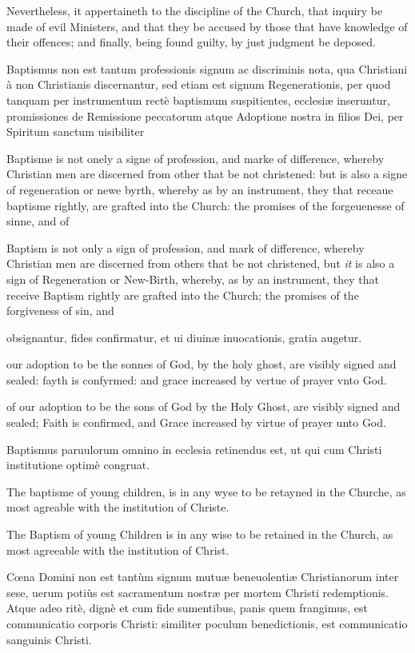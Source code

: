 Nevertheless, it appertaineth to the discipline of the Church, that inquiry be made of evil Ministers, and that they be accused by those that have knowledge of their offences; and finally, being found guilty, by just judgment be deposed.


Baptismus non est tantum professionis signum ac discriminis nota, qua Christiani à non Christianis discernantur, sed etiam est signum Regenerationis, per quod tanquam per instrumentum rectè baptismum suspitientes, ecclesiæ inseruntur, promissiones de Remissione peccatorum atque Adoptione nostra in filios Dei, per Spiritum sanctum uisibiliter

Baptisme is not onely a signe of profession, and marke of difference, whereby Christian men are discerned from other that be not christened: but is also a signe of regeneration or newe byrth, whereby as by an instrument, they that receaue baptisme rightly, are grafted into the Church: the promises of the forgeuenesse of sinne, and of

Baptism is not only a sign of profession, and mark of difference, whereby Christian men are discerned from others that be not christened, but \emph{it} is also a sign of Regeneration or New-Birth, whereby, as by an instrument, they that receive Baptism rightly are grafted into the Church; the promises of the forgiveness of sin, and

obsignantur, fides confirmatur, et ui diuinæ inuocationis, gratia augetur.

our adoption to be the sonnes of God, by the holy ghost, are visibly signed and sealed: fayth is confyrmed: and grace increased by vertue of prayer vnto God.

of our adoption to be the sons of God by the Holy Ghost, are visibly signed and sealed; Faith is confirmed, and Grace increased by virtue of prayer unto God.

Baptismus paruulorum omnino in ecclesia retinendus est, ut qui cum Christi institutione optimè congruat.

The baptisme of young children, is in any wyse to be retayned in the Churche, as most agreable with the institution of Christe.

The Baptism of young Children is in any wise to be retained in the Church, as most agreeable with the institution of Christ.


Cœna Domini non est tantùm signum mutuæ beneuolentiæ Christianorum inter sese, uerum potiùs est sacramentum nostræ per mortem Christi redemptionis. Atque adeo ritè, dignè et cum fide sumentibus, panis quem frangimus, est communicatio corporis Christi: similiter poculum benedictionis, est communicatio sanguinis Christi.

